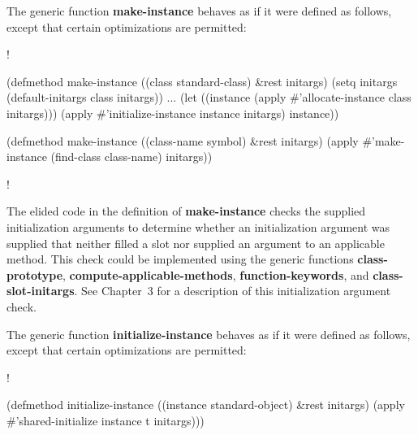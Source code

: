 \endsubSection%


The generic function {\bf make-instance} behaves as if it were defined as
follows, except that certain optimizations are permitted:

\screen!

(defmethod make-instance ((class standard-class) &rest initargs)
  (setq initargs (default-initargs class initargs))
  ...
  (let ((instance (apply #'allocate-instance class initargs)))
    (apply #'initialize-instance instance initargs)
    instance))

(defmethod make-instance ((class-name symbol) &rest initargs)
  (apply #'make-instance (find-class class-name) initargs))

\endscreen!


The elided code in the definition of {\bf make-instance} checks the
supplied initialization arguments to determine whether an initialization
argument was supplied that neither filled a slot nor supplied an argument
to an applicable method. This check could be implemented using the generic
functions {\bf class-prototype}, {\bf compute-applicable-methods}, {\bf
function-keywords}, and {\bf class-slot-initargs}. See Chapter~3 for a
description of this initialization argument check.

The generic function {\bf initialize-instance} behaves as if it were
defined as follows, except that certain optimizations are permitted:

\screen!

(defmethod initialize-instance ((instance standard-object) &rest initargs)
  (apply #'shared-initialize instance t initargs)))
 
